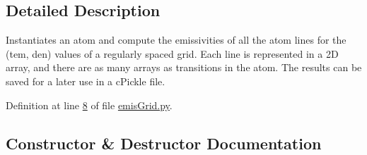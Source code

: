 \subsection{Detailed Description}
\begin{DoxyVerb}Instantiates an atom and compute the emissivities of all the atom lines for the (tem, den) 
values of a regularly spaced grid.
Each line is represented in a 2D array, and there are as many arrays as transitions in the atom.
The results can be saved for a later use in a cPickle file.\end{DoxyVerb}
 

Definition at line \hyperlink{emis_grid_8py_source_l00008}{8} of file \hyperlink{emis_grid_8py_source}{emis\+Grid.\+py}.



\subsection{Constructor \& Destructor Documentation}
\hypertarget{classpyneb_1_1core_1_1emis_grid_1_1_emis_grid_a39c57fa6ec1619540d588cded7bbce9c}{}
